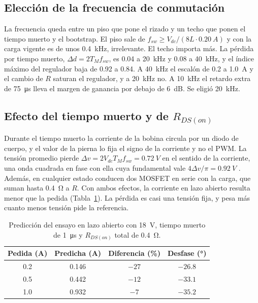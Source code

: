 \documentclass[journal]{IEEEtran}
\begin{document}
\subsection{Elección de la frecuencia de conmutación}
\label{sec:fsw}
La frecuencia queda entre un piso que pone el rizado y un techo que ponen el tiempo muerto y el bootstrap. El piso sale de $f_{sw}\ge V_{dc}/(8L\cdot\SI{0.20}{A})$ y con la carga vigente es de unos \SI{0.4}{kHz}, irrelevante. El techo importa más. La pérdida por tiempo muerto, $\Delta d=2T_Mf_{sw}$, es \num{0.04} a \SI{20}{kHz} y \num{0.08} a \SI{40}{kHz}, y el índice máximo del regulador baja de \num{0.92} a \num{0.84}. A \SI{40}{kHz} el escalón de \num{0.2} a \SI{1.0}{A} y el cambio de $R$ saturan el regulador, y a \SI{20}{kHz} no. A \SI{10}{kHz} el retardo extra de \SI{75}{\micro s} lleva el margen de ganancia por debajo de \SI{6}{dB}. Se eligió \SI{20}{kHz}.

\subsection{Efecto del tiempo muerto y de $R_{DS(on)}$}
\label{sec:tm_modelo}
Durante el tiempo muerto la corriente de la bobina circula por un diodo de cuerpo, y el valor de la pierna lo fija el signo de la corriente y no el PWM. La tensión promedio pierde $\Delta v=2V_{dc}T_Mf_{sw}=\SI{0.72}{V}$ en el sentido de la corriente, una onda cuadrada en fase con ella cuya fundamental vale $4\Delta v/\pi=\SI{0.92}{V}$ \cite{mohan2003power}. Además, en cualquier estado conducen dos MOSFET en serie con la carga, que suman hasta \SI{0.4}{\ohm} a $R$. Con ambos efectos, la corriente en lazo abierto resulta menor que la pedida (Tabla~\ref{tab:lazo_abierto}). La pérdida es casi una tensión fija, y pesa más cuanto menos tensión pide la referencia.

\begin{table}[!ht]
	\centering
	\caption{Predicción del ensayo en lazo abierto con \SI{18}{V}, tiempo muerto de \SI{1}{\micro s} y $R_{DS(on)}$ total de \SI{0.4}{\ohm}.}
	\label{tab:lazo_abierto}
	\begin{tabular}{cccc}
		\toprule
		Pedida (A) & Predicha (A) & Diferencia (\%) & Desfase (°) \\
		\midrule
		\num{0.2} & \num{0.146} & $-27$ & $-26.8$ \\
		\num{0.5} & \num{0.442} & $-12$ & $-33.1$ \\
		\num{1.0} & \num{0.932} & $-7$ & $-35.2$ \\
		\bottomrule
	\end{tabular}
\end{table}
\end{document}

